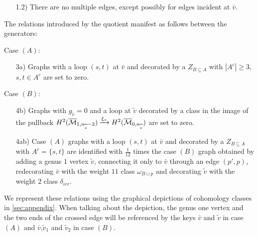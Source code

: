 \begin{enumerate}
    \item[1.2)] There are no multiple edges, except possibly for edges incident at $\bar{v}$.
\end{enumerate}

The relations introduced by the quotient manifest as follows between the generators:\\
\begin{minipage}[t]{0.44\textwidth}
Case $(A)$:
\begin{enumerate}
    \item[3a)] Graphs with a loop $(s,t)$ at $\bar{v}$ and decorated by a $Z_{B\subseteq A}$ with $|A^c|\geq 3$, $s,t\in A^c$ are set to zero.
\end{enumerate}
\end{minipage}
\begin{minipage}[t]{0.56\textwidth}
Case $(B)$:
\begin{enumerate}
    \item[4b)] Graphs with $g_{\tilde{v}}=0$ and a loop at $\tilde{v}$ decorated by a class in the image of the pullback $H^2(\overline{\mathcal{M}}_{1,n_{\widetilde{v}}-2})\xrightarrow{\xi_{*}} H^2(\overline{\mathcal{M}}_{0,n_{\widetilde{v}}})$ are set to zero. 
\end{enumerate}
\end{minipage}%
\begin{enumerate}
    \item[4ab)] Case $(A)$ graphs with a loop $(s,t)$ at $\bar{v}$ and decorated by a $Z_{B\subseteq A}$ with $A^c=\{s,t\}$ are identified with $\frac{1}{12}$ times the case $(B)$ graph obtained by adding a genus $1$ vertex $\tilde{v}$, connecting it only to $\bar{v}$ through an edge $(p',p)$, redecorating $\bar{v}$ with the weight $11$ class $\omega_{B\sqcup p}$ and decorating $\tilde{v}$ with the weight $2$ class $\delta_{irr}$.
\end{enumerate}

We represent these relations using the graphical depictions of cohomology classes in \ref{sec:appendix}. When talking about the depiction, the genus one vertex and the two ends of the crossed edge will be referenced by the keys $\bar{v}$ and $\tilde{v}$ in case $(A)$ and  $\bar{v}$,$\tilde{v}_1$ and $\tilde{v}_2$ in case $(B)$.

